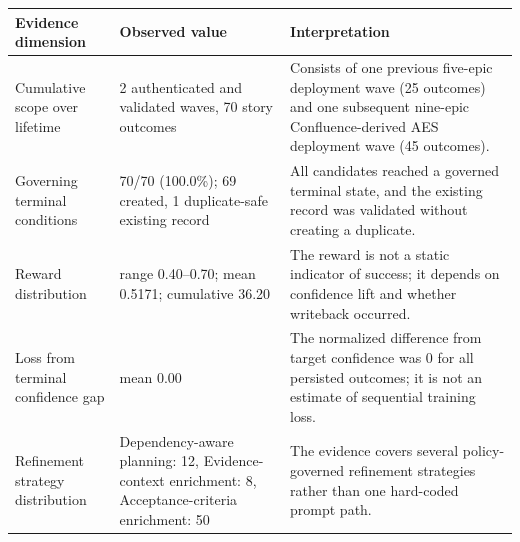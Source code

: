 \begin{tabularx}{\textwidth}{@{}p{}p{}X@{}}
\toprule
Evidence dimension & Observed value & Interpretation \\
\midrule
Cumulative scope over lifetime & 2 authenticated and validated waves, 70 story outcomes & Consists of one previous five-epic deployment wave (25 outcomes) and one subsequent nine-epic Confluence-derived AES deployment wave (45 outcomes). \\
Governing terminal conditions & 70/70 (100.0\%); 69 created, 1 duplicate-safe existing record & All candidates reached a governed terminal state, and the existing record was validated without creating a duplicate. \\
Reward distribution & range 0.40--0.70; mean 0.5171; cumulative 36.20 & The reward is not a static indicator of success; it depends on confidence lift and whether writeback occurred. \\
Loss from terminal confidence gap & mean 0.00 & The normalized difference from target confidence was 0 for all persisted outcomes; it is not an estimate of sequential training loss. \\
Refinement strategy distribution & Dependency-aware planning: 12, Evidence-context enrichment: 8, Acceptance-criteria enrichment: 50 & The evidence covers several policy-governed refinement strategies rather than one hard-coded prompt path. \\
\bottomrule
\end{tabularx}
